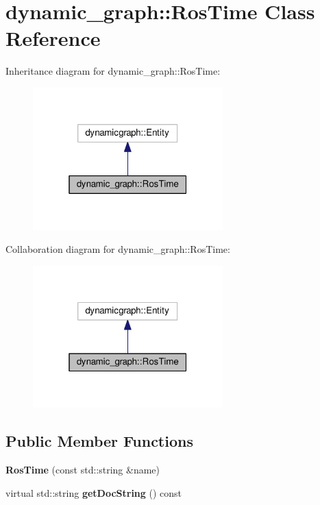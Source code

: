 \hypertarget{classdynamic__graph_1_1RosTime}{}\section{dynamic\+\_\+graph\+:\+:Ros\+Time Class Reference}
\label{classdynamic__graph_1_1RosTime}


Inheritance diagram for dynamic\+\_\+graph\+:\+:Ros\+Time\+:
\nopagebreak
\begin{figure}[H]
\begin{center}
\leavevmode
\includegraphics[width=208pt]{classdynamic__graph_1_1RosTime__inherit__graph}
\end{center}
\end{figure}


Collaboration diagram for dynamic\+\_\+graph\+:\+:Ros\+Time\+:
\nopagebreak
\begin{figure}[H]
\begin{center}
\leavevmode
\includegraphics[width=208pt]{classdynamic__graph_1_1RosTime__coll__graph}
\end{center}
\end{figure}
\subsection*{Public Member Functions}
\begin{DoxyCompactItemize}
\item 
{\bfseries Ros\+Time} (const std\+::string \&name)\hypertarget{classdynamic__graph_1_1RosTime_aa909f2b766b54a543a59ae8642db3bc0}{}\label{classdynamic__graph_1_1RosTime_aa909f2b766b54a543a59ae8642db3bc0}

\item 
virtual std\+::string {\bfseries get\+Doc\+String} () const \hypertarget{classdynamic__graph_1_1RosTime_ad82554947f14f37bc07ccdfde068a3e6}{}\label{classdynamic__graph_1_1RosTime_ad82554947f14f37bc07ccdfde068a3e6}

\end{DoxyCompactItemize}
